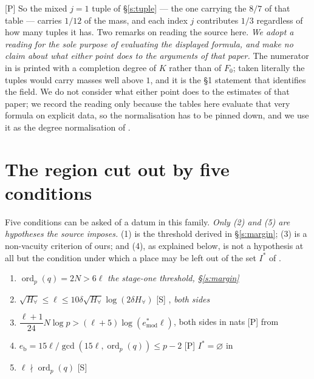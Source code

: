 \documentclass[11pt]{article}
\theoremstyle{plain}
\theoremstyle{definition}
\newcommand{\ord}{\operatorname{ord}}
\begin{document}
\textup{[P]} So the mixed $j=1$ tuple of \S\ref{s:tuple} --- the one carrying the
$8/7$ of that table --- carries $1/12$ of the mass, and each index $j$ contributes
$1/3$ regardless of how many tuples it has.  Two remarks on reading the source
here.  \emph{We adopt a reading for the sole purpose of evaluating the displayed
formula, and make no claim about what either point does to the arguments of that
paper.}  The
numerator in \cite[\S7.1]{DHPS} is printed with a completion degree of $K$ rather
than of $F_0$; taken literally the tuples would carry masses well above $1$, and it
is the \S1 statement that identifies the field.  We do not consider what either point
does to the estimates of that paper; we record the reading only because the tables
here evaluate that very formula on explicit data, so the normalisation has to be
pinned down, and we use it as the degree normalisation of
\cite[Rem.~1.7.1]{IUT4}.

\section{The region cut out by five conditions}\label{s:region}

Five conditions can be asked of a datum in this family.  \emph{Only (2) and (5) are
hypotheses the source imposes.}  (1) is the threshold derived in \S\ref{s:margin};
(3) is a non-vacuity criterion of ours; and (4), as explained below, is not a
hypothesis at all but the condition under which a place may be left out of the
set $I^{*}$ of \cite[Prop.~1.4(iii)]{IUT4}.

\begin{enumerate}[label=(\arabic*),itemsep=1pt]
\item $\ord_p(q)=2N>6\ell$ \hfill \emph{the stage-one threshold, \S\ref{s:margin}}
\item $\sqrt{H_\forall}\le\ell\le10\delta\sqrt{H_\forall}\log(2\delta H_\forall)$
 \hfill \textup{[S]} \cite[Cor.~2.2(ii), (C1)]{IUT4}, \emph{both sides}
\item $\dfrac{\ell+1}{24}N\log p>(\ell+5)\log(e^{*}_{\mathrm{mod}}\ell)$, both sides in nats
 \hfill \textup{[P]} from \cite[Thm.~1.10, Step (v)]{IUT4}
\item $e_{\mathrm b}=15\ell/\gcd(15\ell,\ord_p(q))\le p-2$
 \hfill \textup{[P]} $I^{*}=\varnothing$ in \cite[Prop.~1.4(iii)]{IUT4}
\item $\ell\nmid\ord_p(q)$ \hfill \textup{[S]} \cite[Def.~3.1(c)]{IUT1}
\end{enumerate}
\end{document}
